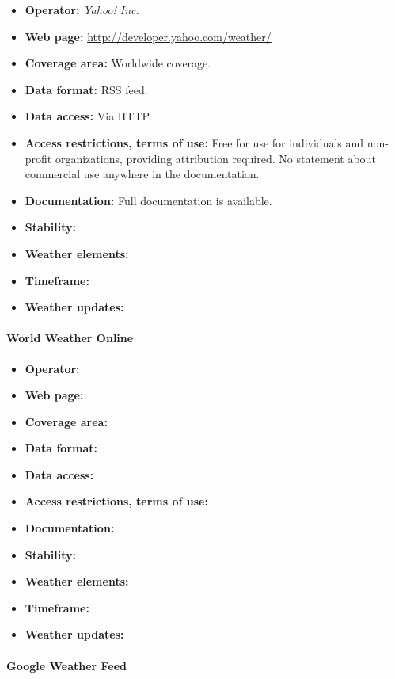 \begin{itemize}
  \item \textbf{Operator:} \emph{Yahoo! Inc.}
  \item \textbf{Web page:} \href{http://developer.yahoo.com/weather/}{http://developer.yahoo.com/weather/}
  \item \textbf{Coverage area:} Worldwide coverage.
  \item \textbf{Data format:} RSS feed.
  \item \textbf{Data access:} Via HTTP.
  \item \textbf{Access restrictions, terms of use:} Free for use for individuals and non-profit organizations, providing attribution required. No statement about commercial use anywhere in the documentation.
  \item \textbf{Documentation:} Full documentation is available.
  \item \textbf{Stability:} %
  \item \textbf{Weather elements:} %
  \item \textbf{Timeframe:} %
  \item \textbf{Weather updates:} %
\end{itemize}

\paragraph{World Weather Online}

\begin{itemize}
  \item \textbf{Operator:}
  \item \textbf{Web page:}
  \item \textbf{Coverage area:}
  \item \textbf{Data format:}
  \item \textbf{Data access:}
  \item \textbf{Access restrictions, terms of use:}
  \item \textbf{Documentation:}
  \item \textbf{Stability:}
  \item \textbf{Weather elements:}
  \item \textbf{Timeframe:}
  \item \textbf{Weather updates:}
\end{itemize}

\paragraph{Google Weather Feed}

